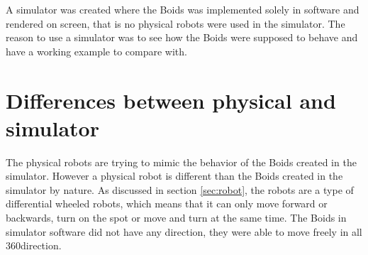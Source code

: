 A simulator was created where the Boids was implemented solely in software and rendered on screen, that is no physical robots were used in the simulator. The reason to use a simulator was to see how the Boids were supposed to behave and have a working example to compare with.

\section{Differences between physical and simulator}
The physical robots are trying to mimic the behavior of the Boids created in the simulator. However a physical robot is different than the Boids created in the simulator by nature. As discussed in section \ref{sec:robot}, the robots are a type of differential wheeled robots, which means that it can only move forward or backwards, turn on the spot or move and turn at the same time. The Boids in simulator software did not have any direction, they were able to move freely in all 360\textdegree direction.